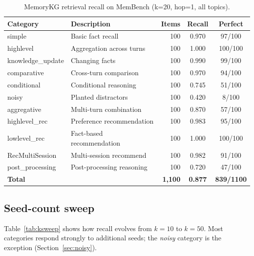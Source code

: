 \documentclass[11pt,a4paper]{article}
\begin{document}
\begin{table}[H]
\centering
\caption{MemoryKG retrieval recall on MemBench (k=20, hop=1, all topics).}
\label{tab:category_results}
\begin{tabular}{llrcc}
  \toprule
  \textbf{Category} & \textbf{Description} & \textbf{Items} & \textbf{Recall} & \textbf{Perfect} \\
  \midrule
  simple           & Basic fact recall          & 100 & 0.970 &  97/100 \\
  highlevel        & Aggregation across turns   & 100 & 1.000 & 100/100 \\
  knowledge\_update & Changing facts            & 100 & 0.990 &  99/100 \\
  comparative      & Cross-turn comparison      & 100 & 0.970 &  94/100 \\
  conditional      & Conditional reasoning      & 100 & 0.745 &  51/100 \\
  noisy            & Planted distractors        & 100 & 0.420 &   8/100 \\
  aggregative      & Multi-turn combination     & 100 & 0.870 &  57/100 \\
  highlevel\_rec    & Preference recommendation & 100 & 0.983 &  95/100 \\
  lowlevel\_rec     & Fact-based recommendation & 100 & 1.000 & 100/100 \\
  RecMultiSession  & Multi-session recommend    & 100 & 0.982 &  91/100 \\
  post\_processing  & Post-processing reasoning & 100 & 0.720 &  47/100 \\
  \midrule
  \textbf{Total}   &                            & \textbf{1,100} & \textbf{0.877} & \textbf{839/1100} \\
  \bottomrule
\end{tabular}
\end{table}

\subsection{Seed-count sweep}

Table~\ref{tab:ksweep} shows how recall evolves from $k{=}10$ to $k{=}50$.
Most categories respond strongly to additional seeds;
the \textit{noisy} category is the exception (Section~\ref{sec:noisy}).
\end{document}
